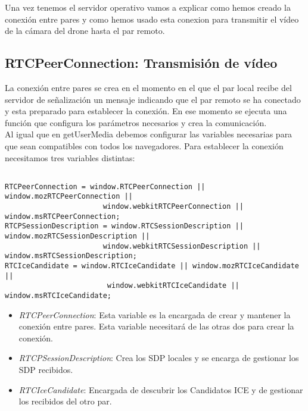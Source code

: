 Una vez tenemos el servidor operativo vamos a explicar como hemos creado la conexión entre pares y como hemos usado esta conexion para transmitir el vídeo de la cámara del drone hasta el par remoto.\\

\subsection{RTCPeerConnection: Transmisión de vídeo}

La conexión entre pares se crea en el momento en el que el par local recibe del servidor de señalización un mensaje indicando que el par remoto se ha conectado y esta preparado para establecer la conexión. En ese momento se ejecuta una función que configura los parámetros necesarios y  crea la comunicación.\\

Al igual que en getUserMedia debemos configurar las variables necesarias para que sean compatibles con todos los navegadores. Para establecer la conexión necesitamos tres variables distintas:\\


\begin{lstlisting}[caption=Variables WebRTC]

RTCPeerConnection = window.RTCPeerConnection || window.mozRTCPeerConnection || 
                       window.webkitRTCPeerConnection || window.msRTCPeerConnection;
RTCPSessionDescription = window.RTCSessionDescription || window.mozRTCSessionDescription ||
                       window.webkitRTCSessionDescription || window.msRTCSessionDescription;
RTCIceCandidate = window.RTCIceCandidate || window.mozRTCIceCandidate ||
                        window.webkitRTCIceCandidate || window.msRTCIceCandidate;

\end{lstlisting}

\begin{itemize}

\item \emph{RTCPeerConnection}: Esta variable es la encargada de crear y mantener la conexión entre pares. Esta variable necesitará de las otras dos para crear la conexión.
\item \emph{RTCPSessionDescription}: Crea los SDP locales y se encarga de gestionar los SDP recibidos.
\item \emph{RTCIceCandidate}: Encargada de descubrir los Candidatos ICE y de gestionar los recibidos del otro par.

\end{itemize}


